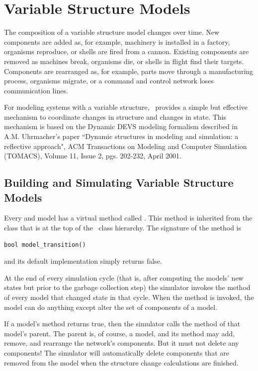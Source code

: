 \chapter{Variable Structure Models}
The composition of a variable structure model changes over time. New components are added as, for example, machinery is installed in a factory, organisms reproduce, or shells are fired from a cannon. Existing components are removed as machines break, organisms die, or shells in flight find their targets. Components are rearranged as, for example, parts move through a manufacturing process, organisms migrate, or a command and control network loses communication lines.

For modeling systems with a variable structure, \adevs\ provides a simple but effective mechanism to coordinate changes in structure and changes in state. This mechanism is based on the Dynamic DEVS modeling formalism described in A.M. Uhrmacher's paper ``Dynamic structures in modeling and simulation: a reflective approach", ACM Transactions on Modeling and Computer Simulation (TOMACS), Volume 11, Issue 2, pgs. 202-232, April 2001.

\section{Building and Simulating Variable Structure Models}
Every  and  model has a virtual method called . This method is inherited from the  class that is at the top of the \adevs\ class hierarchy. The signature of the  method is
\begin{verbatim}
bool model_transition()
\end{verbatim}
and its default implementation simply returns false.

At the end of every simulation cycle (that is, after computing the models' new states but prior to the garbage collection step) the simulator invokes the  method of every  model that changed state in that cycle. When the  method is invoked, the  model can do anything except alter the set of components of a  model.

If a model's  method returns true, then the simulator calls the  method of that model's parent. The parent is, of course, a  model, and its  method may add, remove, and rearrange the network's components. But it must not delete any components! The simulator will automatically delete components that are removed from the model when the structure change calculations are finished.

